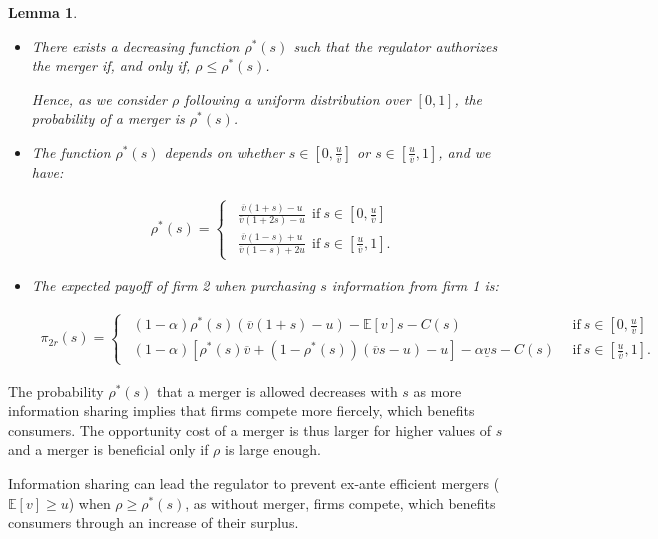 \documentclass[a4paper,leqno]{article}%
\newtheorem{lemma}{Lemma}
\newcommand{\E}{\mathbb E}
\renewcommand{\a}{\alpha}
\newcommand{\uv}{\underline{v}}
\newcommand{\ov}{\overline{v}}
\begin{document}
\begin{lemma}~~\label{lem3}

\begin{itemize}
    \item There exists a decreasing function $\rho^*(s)$ such that the regulator authorizes the merger if, and only if, $\rho\leq \rho^*(s)$. 

Hence, as we consider $\rho$ following a uniform distribution over $[0,1]$, the probability of a merger is $\rho^*(s)$.
    \item The function $\rho^*(s)$ depends on whether $s\in[0,\frac{u}{\ov}]$ or $s\in[\frac{u}{\ov},1]$, and we have: 

\begin{align}
~\rho^*(s)=
\begin{cases}
    ~~\frac{\ov(1+s)-u}{\ov(1+2s)-u}~~\textrm{if}~s\in[0,\frac{u}{\ov}]\\ 
    ~~\frac{\ov(1-s)+u}{\ov(1-s)+2u}~~\textrm{if}~s\in[\frac{u}{\ov},1].
\end{cases}
\end{align}
    \item The expected payoff of firm 2 when purchasing $s$ information from firm 1 is:
    
\begin{align}
~\pi_{2r}(s)=
\begin{cases}
    ~~(1-\a)\rho^*(s)(\ov(1+s)-u)-\E[v]s-C(s)&\textrm{if}~s\in[0,\frac{u}{\ov}]\\ 
    ~~(1-\a)[\rho^*(s)\ov+(1-\rho^*(s))(\ov s-u)-u]-\a\uv s-C(s)~~&\textrm{if}~s\in[\frac{u}{\ov},1].
\end{cases}
\end{align}
\end{itemize}

\end{lemma}

\medskip

\noindent The probability $\rho^*(s)$ that a merger is allowed decreases with $s$ as more information sharing implies that firms compete more fiercely, which benefits consumers. The opportunity cost of a merger is thus larger for higher values of $s$ and a merger is beneficial only if $\rho$ is large enough. 

\medskip

Information sharing can lead the regulator to prevent ex-ante efficient mergers ($\E[v] \geq u$) when $\rho \geq \rho^*(s)$, as without merger, firms compete, which benefits consumers through an increase of their surplus. 
\end{document}
